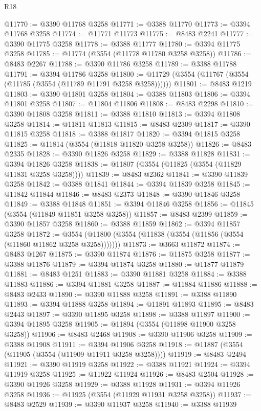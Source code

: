 \begin{lexlean}{R18}
\begin{coremodule}
@11770 := @3390 @11768 @3258
@11771 := @3388 @11770
@11773 := @3394 @11768 @3258
@11774 := @11771 @11773
@11775 := @8483 @2241
@11777 := @3390 @11775 @3258
@11778 := @3388 @11777
@11780 := @3394 @11775 @3258
@11785 := @11774 (@3554 (@11778 @11780 @3258 @3258))
@11786 := @8483 @2267
@11788 := @3390 @11786 @3258
@11789 := @3388 @11788
@11791 := @3394 @11786 @3258
@11800 := @11729 (@3554 (@11767 (@3554 (@11785 (@3554 (@11789 @11791 @3258 @3258))))))
@11801 := @8483 @1219
@11803 := @3390 @11801 @3258
@11804 := @3388 @11803
@11806 := @3394 @11801 @3258
@11807 := @11804 @11806
@11808 := @8483 @2298
@11810 := @3390 @11808 @3258
@11811 := @3388 @11810
@11813 := @3394 @11808 @3258
@11814 := @11811 @11813
@11815 := @8483 @2309
@11817 := @3390 @11815 @3258
@11818 := @3388 @11817
@11820 := @3394 @11815 @3258
@11825 := @11814 (@3554 (@11818 @11820 @3258 @3258))
@11826 := @8483 @2335
@11828 := @3390 @11826 @3258
@11829 := @3388 @11828
@11831 := @3394 @11826 @3258
@11838 := @11807 (@3554 (@11825 (@3554 (@11829 @11831 @3258 @3258))))
@11839 := @8483 @2362
@11841 := @3390 @11839 @3258
@11842 := @3388 @11841
@11844 := @3394 @11839 @3258
@11845 := @11842 @11844
@11846 := @8483 @2373
@11848 := @3390 @11846 @3258
@11849 := @3388 @11848
@11851 := @3394 @11846 @3258
@11856 := @11845 (@3554 (@11849 @11851 @3258 @3258))
@11857 := @8483 @2399
@11859 := @3390 @11857 @3258
@11860 := @3388 @11859
@11862 := @3394 @11857 @3258
@11872 := @3554 (@11800 (@3554 (@11838 (@3554 (@11856 (@3554 (@11860 @11862 @3258 @3258)))))))
@11873 := @3663 @11872
@11874 := @8483 @1267
@11875 := @3390 @11874
@11876 := @11875 @3258
@11877 := @3388 @11876
@11879 := @3394 @11874 @3258
@11880 := @11877 @11879
@11881 := @8483 @1251
@11883 := @3390 @11881 @3258
@11884 := @3388 @11883
@11886 := @3394 @11881 @3258
@11887 := @11884 @11886
@11888 := @8483 @2433
@11890 := @3390 @11888 @3258
@11891 := @3388 @11890
@11893 := @3394 @11888 @3258
@11894 := @11891 @11893
@11895 := @8483 @2443
@11897 := @3390 @11895 @3258
@11898 := @3388 @11897
@11900 := @3394 @11895 @3258
@11905 := @11894 (@3554 (@11898 @11900 @3258 @3258))
@11906 := @8483 @2468
@11908 := @3390 @11906 @3258
@11909 := @3388 @11908
@11911 := @3394 @11906 @3258
@11918 := @11887 (@3554 (@11905 (@3554 (@11909 @11911 @3258 @3258))))
@11919 := @8483 @2494
@11921 := @3390 @11919 @3258
@11922 := @3388 @11921
@11924 := @3394 @11919 @3258
@11925 := @11922 @11924
@11926 := @8483 @2504
@11928 := @3390 @11926 @3258
@11929 := @3388 @11928
@11931 := @3394 @11926 @3258
@11936 := @11925 (@3554 (@11929 @11931 @3258 @3258))
@11937 := @8483 @2529
@11939 := @3390 @11937 @3258
@11940 := @3388 @11939

\end{coremodule}
\end{lexlean}
